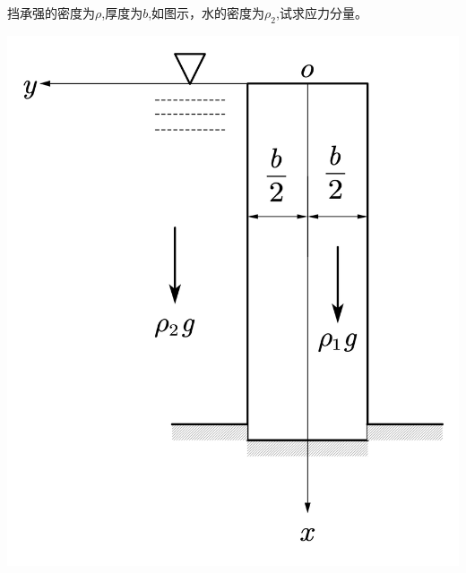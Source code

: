 \begin{example}
	挡承强的密度为$\rho$,厚度为$b$,如图示，水的密度为$\rho_2$,试求应力分量。
\end{example}
\centerline{\includegraphics[scale=0.4]{figure/3-7.png}}
